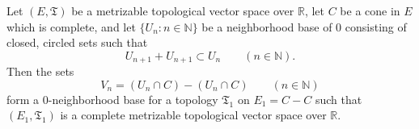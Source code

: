Let $(E, \mathfrak{T})$ be a metrizable topological vector space over $\mathbb{R}$, let $C$ be a cone in $E$ which is complete, and let $\{U_n : n \in \mathbb{N}\}$ be a neighborhood base of $0$ consisting of closed, circled sets such that
$$U_{n+1} + U_{n+1} \subset U_n \qquad (n \in \mathbb{N}).$$
Then the sets
$$V_n = (U_n \cap C) - (U_n \cap C) \qquad (n \in \mathbb{N})$$
form a $0$-neighborhood base for a topology $\mathfrak{T}_1$ on $E_1 = C - C$ such that $(E_1, \mathfrak{T}_1)$ is a complete metrizable topological vector space over $\mathbb{R}$.
